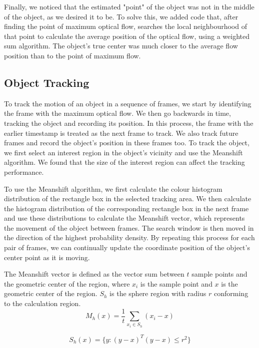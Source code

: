 \documentclass[12pt]{article}
\begin{document}
Finally, we noticed that the estimated "point" of the object was not in the middle of the object, as we desired it to be. To solve this, we added code that, after finding the point of maximum optical flow, searches the local neighbourhood of that point to calculate the average position of the optical flow, using a weighted sum algorithm. The object's true center was much closer to the average flow position than to the point of maximum flow.


\subsection*{Object Tracking}
To track the motion of an object in a sequence of frames, we start by identifying the frame with the maximum optical flow. We then go backwards in time, tracking the object and recording its position. In this process, the frame with the earlier timestamp is treated as the next frame to track. We also track future frames and record the object's position in these frames too. To track the object, we first select an interest region in the object's vicinity and use the Meanshift algorithm. We found that the size of the interest region can affect the tracking performance.

To use the Meanshift algorithm, we first calculate the colour histogram distribution of the rectangle box in the selected tracking area. We then calculate the histogram distribution of the corresponding rectangle box in the next frame and use these distributions to calculate the Meanshift vector, which represents the movement of the object between frames. The search window is then moved in the direction of the highest probability density. By repeating this process for each pair of frames, we can continually update the coordinate position of the object's center point as it is moving.

The Meanshift vector is defined as the vector sum between $t$ sample points and the geometric center of the region, where  ${x_i}$ is the sample point and  $x$ is the geometric center of the region. ${S_h}$  is the sphere region with radius $r$  conforming to the calculation region.
\[{M_h}(x) = \frac{1}{t}\sum\limits_{{x_i} \in {S_h}} {({x_i} - x)} \]

\[{S_h}(x) = \{ y:{(y - x)^T}(y - x) \le {r^2}\} \] 
\end{document}
